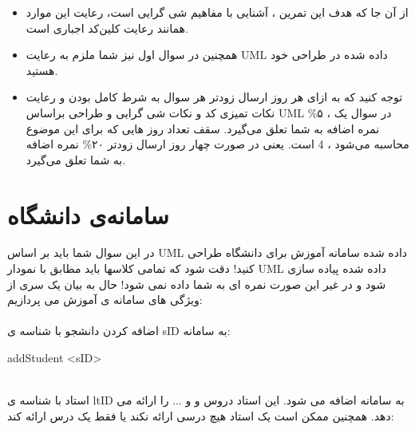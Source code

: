 \documentclass[]{article}
\begin{document}
\begin{itemize}[label=$\ast$]
\item
از آن جا که هدف این تمرین ، آشنایی با مفاهیم شی گرایی است، رعایت این موارد همانند رعایت ‌کلین‌کد اجباری است.

\item
همچنین در سوال اول نیز شما ملزم به رعایت UML داده شده در طراحی خود هستید.

\item

توجه کنید که به ازای هر روز ارسال زودتر هر سوال به شرط کامل بودن و رعایت نکات تمیزی کد و نکات شی گرایی و طراحی براساس UML در سوال یک ، ۵\% نمره اضافه به شما تعلق می‌گیرد. سقف تعداد روز هایی که برای این موضوع محاسبه می‌شود ، 4 است. یعنی در صورت  چهار روز  ارسال زودتر  ۲۰\% نمره اضافه به شما تعلق می‌گیرد.
\end{itemize}




\newpage
\section{سامانه‌ی دانشگاه}
در این سوال شما باید بر اساس UML داده شده سامانه آموزش برای دانشگاه طراحی کنید! دقت شود که تمامی کلاسها باید مطابق با نمودار UML داده شده پیاده سازی شود و در غیر این صورت نمره ای به شما داده نمی شود! حال به بیان یک سری از ویژگی های سامانه ی آموزش می پردازیم:
\\\\
اضافه کردن دانشجو با شناسه ی sID به سامانه:
\begin{tcolorbox}[boxrule=0pt]
	\begin{latin}
  	  \large{
  	  	addStudent <sID>
		}
	\end{latin}
\end{tcolorbox}
\noindent
\\استاد با شناسه ی ltID به سامانه اضافه می شود. این استاد دروس  و  و ... را ارائه می دهد. همچنین
ممکن است یک استاد هیچ درسی ارائه نکند یا فقط یک درس ارائه کند:
\end{document}
